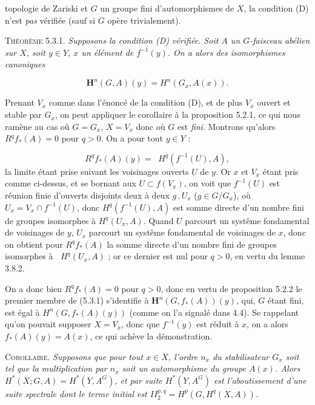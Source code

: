 \clearpage
{}

\noindent topologie de Zariski et $G$ un groupe fini d'automorphismes de $X$,
la condition (D) n'est \textit{pas} vérifiée (sauf si $G$ opère trivialement).

\textsc{Théorème 5.3.1.} \textit{Supposons la condition (D) vérifiée.
Soit $A$ un $G$-faisceau abélien sur $X$, soit $y\in Y$, $x$ un élément de
$f^{-1}(y)$. On a alors des isomorphismes canoniques}

\[
\mathbf H^n(G,A)(y)=H^n(G_x,A(x)).
\tag{5.3.1}
\]

Prenant $V_x$ comme dans l'énoncé de la condition (D), et de plus $V_x$
ouvert et stable par $G_x$, on peut appliquer le corollaire à la proposition
5.2.1, ce qui nous ramène au cas oû $G=G_x$, $X=V_x$ donc où $G$ est
\textit{fini}. Montrons qu'alors $R^qf_*(A)=0$ pour $q>0$. On a pour tout
$y\in Y$ :

\[
R^qf_*(A)(y)=\mathop{\underset{\to}{\mathrm{lim.}}} H^q(f^{-1}(U),A),
\]
la limite étant prise suivant les voisinages ouverts $U$ de $y$. Or $x$ et
$V_x$ étant pris comme ci-dessus, et se bornant aux $U\subset f(V_x)$, on
voit que $f^{-1}(U)$ est réunion finie d'ouverts disjoints deux à deux
$g\mathbin{.}U_x$ ($g\in G/G_x$), où $U_x=V_x\cap f^{-1}(U)$, donc
$H^q(f^{-1}(U),A)$ est somme directe d'un nombre fini de groupes isomorphes à
$H^q(U_x,A)$. Quand $U$ parcourt un systême fondamental de voisinages de $y$,
$U_x$ parcourt un systême fondamental de voisinages de $x$, donc on obtient
pour $R^qf_*(A)$ la somme directe d'un nombre fini de groupes isomorphes à
$\mathop{\underset{\to}{\lim}} H^q(U_x,A)$ ; or ce dernier est nul pour $q>0$, en vertu du lemme
3.8.2.

On a donc bien $R^qf_*(A)=0$ pour $q>0$, donc en vertu de proposition 5.2.2 le
premier membre de (5.3.1) s'identifie à $\mathbf H^n(G,f_*(A))(y)$, qui, $G$
étant fini, est égal à $H^n(G,f_*(A)(y))$ (comme on l'a signalé dans 4.4). Se
rappelant qu'on pouvait supposer $X=V_x$, donc que $f^{-1}(y)$ est réduit à
$x$, on a alors $f_*(A)(y)=A(x)$, ce qui achève la démonstration.

\textsc{Corollaire.} \textit{Supposons que pour tout $x\in X$,
l'ordre $n_x$ du stabilisateur $G_x$ soit tel que la multiplication par $n_x$
soit un automorphisme du groupe $A(x)$. Alors
$H^*(X;G,A)=H^*(Y,A^G)$, et par suite $H^*(Y,A^G)$ est l'aboutissement d'une
suite spectrale dont le terme initial est
$II_2^{p,q}=H^p(G,H^q(X,A))$.}

